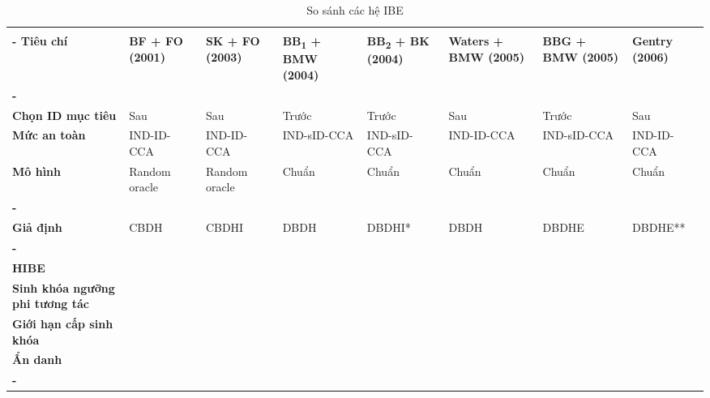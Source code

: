 \baselineskip
\small
\begin{longtabu}{| >{\bfseries\centering}p{2cm} X[c] X[c] X[c] X[c] X[c] X[c] X[c] |}
	\captionsetup{font=normalsize}
	\caption{So sánh các hệ IBE} \\
	\tabucline[4pt]-
	\everyrow{\tabucline[1pt]-}
	Tiêu chí &
	\bfseries BF 					\newline + FO 	\newline (2001) &
	\bfseries SK 					\newline + FO 	\newline (2003) &
	\bfseries BB\textsubscript{1} 	\newline + BMW 	\newline (2004) &
	\bfseries BB\textsubscript{2} 	\newline + BK 	\newline (2004) &
	\bfseries Waters 				\newline + BMW 	\newline (2005) &
	\bfseries BBG 					\newline + BMW 	\newline (2005) &
	\bfseries Gentry 				\newline		\newline (2006) \\
	\tabucline[1pt]-
	 \\
	Chọn ID mục tiêu 	& Sau 			& Sau 			& Trước 		& Trước 		& Sau 			& Trước 		& Sau 			\\
	Mức an toàn 		& IND-ID-CCA 	& IND-ID-CCA 	& IND-sID-CCA 	& IND-sID-CCA 	& IND-ID-CCA 	& IND-sID-CCA 	& IND-ID-CCA 	\\
	Mô hình 			& Random oracle & Random oracle & Chuẩn 		& Chuẩn 		& Chuẩn 		& Chuẩn 		& Chuẩn 		\\
	\tabucline[1pt]-
	 \\
	Giả định 			& CBDH 			& CBDHI 		& DBDH 			& DBDHI* 		& DBDH 			& DBDHE 		& DBDHE** 		\\
	\tabucline[1pt]-
	 \\
	HIBE 							& \checkmark 	& & \checkmark 	& & \checkmark 	& \checkmark 	& 				\\
	Sinh khóa ngưỡng phi tương tác 	& \checkmark 	& & \checkmark 	& & \checkmark 	& \checkmark 	& 				\\
	Giới hạn cấp sinh khóa 			& 				& & 			& & 			& \checkmark 	& 				\\
	Ẩn danh 						& 				& & 			& & 			& 				& \checkmark 	\\
	\everyrow{}
	\tabucline[3pt]-
\end{longtabu}
\normalsize